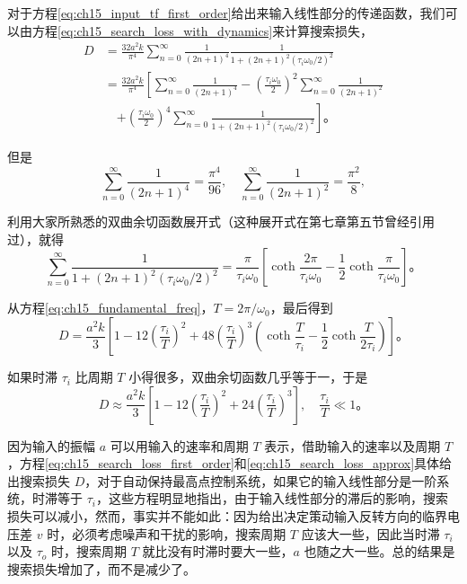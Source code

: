 对于方程\eqref{eq:ch15_input_tf_first_order}给出来输入线性部分的传递函数，我们可以由方程\eqref{eq:ch15_search_loss_with_dynamics}来计算搜索损失，
\begin{equation*}
\begin{aligned}
D &= \frac{32a^2k}{\pi^4}\sum_{n=0}^\infty \frac{1}{(2n+1)^4}\frac{1}{1+(2n+1)^2(\tau_i\omega_0/2)^2} \\
&= \frac{32a^2k}{\pi^4}\left[\sum_{n=0}^\infty \frac{1}{(2n+1)^4} - \left(\frac{\tau_i\omega_0}{2}\right)^2\sum_{n=0}^\infty \frac{1}{(2n+1)^2}\right. \\
&\quad \left. + \left(\frac{\tau_i\omega_0}{2}\right)^4\sum_{n=0}^\infty \frac{1}{1+(2n+1)^2(\tau_i\omega_0/2)^2}\right]。
\end{aligned}
\end{equation*}

但是
\begin{equation*}
\sum_{n=0}^\infty \frac{1}{(2n+1)^4} = \frac{\pi^4}{96},\quad \sum_{n=0}^\infty \frac{1}{(2n+1)^2} = \frac{\pi^2}{8},
\end{equation*}

利用大家所熟悉的双曲余切函数展开式（这种展开式在第七章第五节曾经引用过），就得
\begin{equation*}
\sum_{n=0}^\infty \frac{1}{1+(2n+1)^2(\tau_i\omega_0/2)^2} = \frac{\pi}{\tau_i\omega_0}\left[\coth\frac{2\pi}{\tau_i\omega_0} - \frac{1}{2}\coth\frac{\pi}{\tau_i\omega_0}\right]。
\end{equation*}

从方程\eqref{eq:ch15_fundamental_freq}，$T=2\pi/\omega_0$，最后得到
\begin{equation}
D = \frac{a^2k}{3}\left[1 - 12\left(\frac{\tau_i}{T}\right)^2 + 48\left(\frac{\tau_i}{T}\right)^3\left(\coth\frac{T}{\tau_i} - \frac{1}{2}\coth\frac{T}{2\tau_i}\right)\right]。
\label{eq:ch15_search_loss_first_order}
\end{equation}

如果时滞 $\tau_i$ 比周期 $T$ 小得很多，双曲余切函数几乎等于一，于是
\begin{equation}
D \approx \frac{a^2k}{3}\left[1 - 12\left(\frac{\tau_i}{T}\right)^2 + 24\left(\frac{\tau_i}{T}\right)^3\right],\quad \frac{\tau_i}{T}\ll1。
\label{eq:ch15_search_loss_approx}
\end{equation}

因为输入的振幅 $a$ 可以用输入的速率和周期 $T$ 表示，借助输入的速率以及周期 $T$，方程\eqref{eq:ch15_search_loss_first_order}和\eqref{eq:ch15_search_loss_approx}具体给出搜索损失 $D$，对于自动保持最高点控制系统，如果它的输入线性部分是一阶系统，时滞等于 $\tau_i$，这些方程明显地指出，由于输入线性部分的滞后的影响，搜索损失可以减小，然而，事实并不能如此：因为给出决定策动输入反转方向的临界电压差 $v$ 时，必须考虑噪声和干扰的影响，搜索周期 $T$ 应该大一些，因此当时滞 $\tau_i$ 以及 $\tau_o$ 时，搜索周期 $T$ 就比没有时滞时要大一些，$a$ 也随之大一些。总的结果是搜索损失增加了，而不是减少了。


